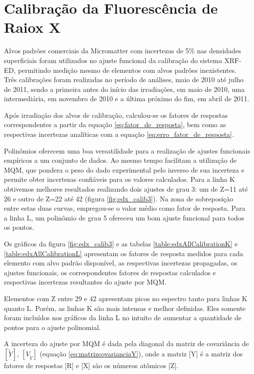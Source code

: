 \section{Calibração da Fluorescência de Raiox X}

Alvos padrões comerciais da Micromatter com incertezas de 5\% nas densidades 
superficiais foram utilizados no ajuste funcional da calibração do sistema XRF-ED, 
permitindo medição mesmo de elementos com alvos padrões inexistentes. Três
calibrações foram realizadas no período de análises, maio de 2010 até julho de 
2011, sendo a primeira antes do início das irradiações, em maio de 2010, 
uma intermediária, em novembro de 2010 e a última próximo do fim, em abril de 
2011.

Após irradiação dos alvos de calibração, calculou-se os fatores de respostas 
correspondentes a partir da equação \ref{eq:fator_de_resposta}, bem como as 
respectivas incertezas analíticas com a equação \ref{eq:erro_fator_de_resposta}.

Polinômios oferecem uma boa versatilidade para a realização de ajustes 
funcionais empíricos a um conjunto de dados. Ao mesmo tempo facilitam a 
utilização de MQM, que pondera o peso do dado experimental pelo inverso de sua 
incerteza e permite obter incertezas confiáveis para os valores calculados. 
Para a linha K obtivemos melhores resultados realizando dois ajustes de grau 3: 
um de Z=11 até 26 e outro de Z=22 até 42 (figura \ref{fig:edx_calib3}). 
Na zona de sobreposição entre estas duas curvas, empregou-se o valor médio como
fator de resposta. Para a linha L, um polinômio de grau 5 ofereceu um bom 
ajuste funcional para todos os pontos.

Os gráficos da figura \ref{fig:edx_calib3} e as tabelas \ref{table:edxAllCalibrationK} e 
\ref{table:edxAllCalibrationL} apresentam os fatores de resposta medidos para 
cada elemento com alvo padrão disponível, as respectivas incertezas propagadas,
os ajustes funcionais, os correspondentes fatores de respostas calculados e 
respectivas incertezas resultantes do ajuste por MQM.

Elementos com Z entre 29 e 42 apresentam picos no espectro tanto para linhas K 
quanto L. Porém, as linhas K são mais intensas e melhor definidas. Eles somente 
foram incluídos nos gráficos da linha L no intuito de aumentar a quantidade de 
pontos para o ajuste polinomial.

A incerteza do ajuste por MQM é dada pela diagonal da matriz de covariância de 
$[\tilde{Y}]$, $[V_{\tilde{Y}}]$ (equação \ref{eq:matrizcovarianciaY}), onde 
a matriz [Y] é a matriz dos fatores de respostas [R] e [X] são os números 
atômicos [Z]. 

